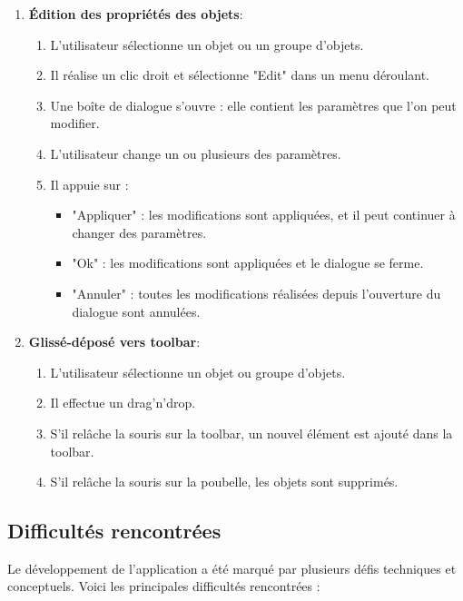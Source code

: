 \documentclass[a4paper,11pt]{article}
\begin{document}
\begin{enumerate}
\begin{enumerate}
    \end{enumerate}
    \item \textbf{Édition des propriétés des objets}:
    \begin{enumerate}
        \item L'utilisateur sélectionne un objet ou un groupe d'objets.
        \item Il réalise un clic droit et sélectionne "Edit" dans un menu déroulant.
        \item Une boîte de dialogue s'ouvre : elle contient les paramètres que l'on peut modifier.
        \item L'utilisateur change un ou plusieurs des paramètres.
        \item Il appuie sur :
        \begin{itemize}
            \item "Appliquer" : les modifications sont appliquées, et il peut continuer à changer des paramètres.
            \item "Ok" : les modifications sont appliquées et le dialogue se ferme.
            \item "Annuler" : toutes les modifications réalisées depuis l'ouverture du dialogue sont annulées.
        \end{itemize}
    \end{enumerate}
    \item \textbf{Glissé-déposé vers toolbar}:
    \begin{enumerate}
        \item L'utilisateur sélectionne un objet ou groupe d'objets.
        \item Il effectue un drag'n'drop.
        \item S'il relâche la souris sur la toolbar, un nouvel élément est ajouté dans la toolbar.
        \item S'il relâche la souris sur la poubelle, les objets sont supprimés.
    \end{enumerate}
\end{enumerate}
\pagebreak
\subsection{Difficultés rencontrées}

Le développement de l'application a été marqué par plusieurs défis techniques et conceptuels. Voici les principales difficultés rencontrées :
\end{document}
